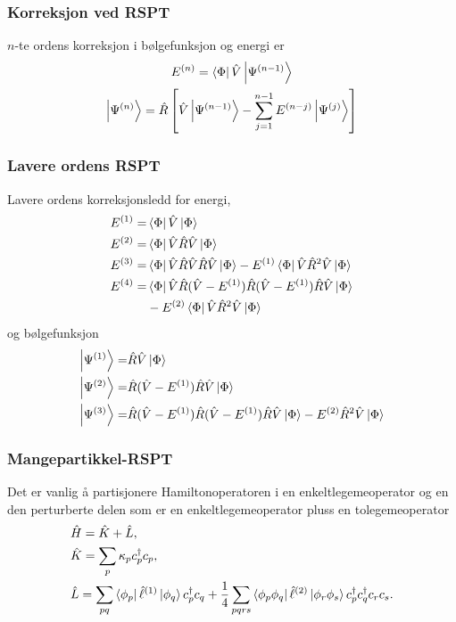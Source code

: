 \documentclass{beamer}
\begin{document}
\begin{frame}
	\frametitle{Korreksjon ved RSPT}
	$n$-te ordens korreksjon i bølgefunksjon og energi er
	\begin{gather}
		E^{(n)} = \bra{\Phi}\hat V \ket{\Psi^{(n-1)}}\\
		\ket{\Psi^{(n)}} = \hat R \left[\hat V \ket{\Psi^{(n-1)}} - \sum_{j=1}^{n-1}E^{(n-j)}\ket{\Psi^{(j)}} \right]
	\end{gather}

\end{frame}
	

\begin{frame}
	
	\frametitle{Lavere ordens RSPT}
	Lavere ordens korreksjonsledd for energi,
	\begin{align}
		E^{(1)} =& \bra{\Phi} \hat V \ket{\Phi} \\
		E^{(2)} =& \bra{\Phi} \hat V \hat R \hat V \ket{\Phi} \\
		E^{(3)} =& \bra{\Phi} \hat V \hat R \hat V \hat R \hat V \ket{\Phi} - E^{(1)}\bra{\Phi} \hat V \hat R^2 \hat V \ket{\Phi} \\
		E^{(4)} = & \bra{\Phi} \hat V\hat R (\hat V - E^{(1)}) \hat R (\hat V - E^{(1)}) \hat R \hat V \ket{\Phi}  \\
					&- E^{(2)}\bra{\Phi}\hat V \hat R^2 \hat V \ket{\Phi}
	\end{align}
	og bølgefunksjon
	\begin{align}
		\ket{\Psi^{(1)}} =& \hat R \hat V \ket{\Phi} \\
		\ket{\Psi^{(2)}} =& \hat R (\hat V - E^{(1)}) \hat R \hat V\ket{\Phi} \\
		\ket{\Psi^{(3)}} =& \hat R (\hat V - E^{(1)}) \hat R (\hat V - E^{(1)}) \hat R \hat V \ket{\Phi} - E^{(2)}\hat R^2 \hat V\ket{\Phi}
	\end{align}
	
\end{frame}


\begin{frame}
	
	\frametitle{Mangepartikkel-RSPT}

	Det er vanlig å partisjonere Hamiltonoperatoren i en enkeltlegemeoperator og en den perturberte delen som er en enkeltlegemeoperator pluss en tolegemeoperator
	\begin{align}
		&\hat H = \hat K + \hat L, \\
		&\hat K = \sum_p \kappa_p c^\dagger_p c_p, \\
		&\hat L = \sum_{pq} \bra{\phi_p} \hat \ell^{(1)}\ket{\phi_q}c^\dagger_p c_q + \frac{1}{4}\sum_{pqrs}\bra{\phi_p\phi_q}\hat \ell^{(2)} \ket{\phi_r\phi_s}c^\dagger_p c^\dagger_q c_r c_s.
	\end{align}	
	
\end{frame}
\end{document}
